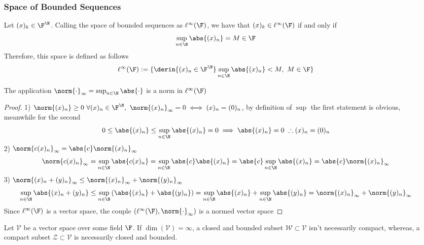 \documentclass[../mmf.tex]{subfiles}
\begin{document}
\subsubsection{Space of Bounded Sequences}
\begin{dfn}
	Let $(x)_k\in\F^\N$. Calling the space of bounded sequences as $\ell^\infty(\F)$, we have that $(x)_k\in\ell^\infty(\F)$ if and only if
	\begin{equation}
		\sup_{n\in\N}\abs{(x)_n}=M\in\F
		\label{eq:boundedseq}
	\end{equation}
	Therefore, this space is defined as follows
	\begin{equation}
		\ell^\infty(\F):=\{\derin{(x)_n\in\F^\N}\sup_{n\in\N}\abs{(x)_n}<M,\ M\in\F\}
		\label{eq:ellinf}
	\end{equation}
\end{dfn}
\begin{thm}
	The application $\norm{\cdot}_{\infty}=\sup_{n\in\N}\abs{\cdot}$ is a norm in $\ell^\infty(\F)$
\end{thm}
\begin{proof}
	1) $\norm{(x)_n}\ge0\ \forall(x)_n\in\F^\N,\ \norm{(x)_n}_{\infty}=0\iff(x)_n=(0)_n$, by definition of $\sup$ the first statement is obvious, meanwhile for the second
	\begin{equation*}
		0\le\abs{(x)_n}\le\sup_{n\in\N}\abs{(x)_n}=0\implies\abs{(x)_n}=0\ \therefore(x)_n=(0)_n
	\end{equation*}
	2) $\norm{c(x)_n}_{\infty}=\abs{c}\norm{(x)_n}_{\infty}$
	\begin{equation*}
		\norm{c(x)_n}_{\infty}=\sup_{n\in\N}\abs{c(x)_n}=\sup_{n\in\N}\abs{c}\abs{(x)_n}=\abs{c}\sup_{n\in\N}\abs{(x)_n}=\abs{c}\norm{(x)_n}_{\infty}
	\end{equation*}
	3) $\norm{(x)_n+(y)_n}_{\infty}\le\norm{(x)_n}_\infty+\norm{(y)_n}_\infty$
	\begin{equation*}
		\sup_{n\in\N}\abs{(x)_n+(y)_n}\le\sup_{n\in\N}\left( \abs{(x)_n}+\abs{(y)_n} \right)=\sup_{n\in\N}\abs{(x)_n}+\sup_{n\in\N}\abs{(y)_n}=\norm{(x)_n}_\infty+\norm{(y)_n}_\infty
	\end{equation*}
	Since $\ell^\infty(\F)$ is a vector space, the couple $(\ell^\infty(\F),\norm{\cdot}_{\infty})$ is a normed vector space
\end{proof}
\begin{rmk}
	Let $\mathcal{V}$ be a vector space over some field $\F$. If $\dim(\mathcal{V})=\infty$, a closed and bounded subset $\mathcal{W}\subset\mathcal{V}$ isn't necessarily compact, whereas, a compact subset $\mathcal{Z}\subset\mathcal{V}$ is necessarily closed and bounded.
\end{rmk}
\end{document}
